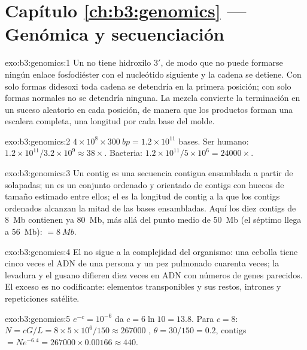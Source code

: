 \section*{Capítulo \ref{ch:b3:genomics} --- Genómica y secuenciación}

\begin{solution}{exo:b3:genomics:1}
Un  no tiene hidroxilo 3$'$, de modo que no puede
formarse ningún enlace fosfodiéster con el nucleótido siguiente y la
cadena se detiene. Con solo formas didesoxi toda cadena se detendría en
la primera posición; con solo formas normales no se detendría ninguna. La
mezcla convierte la terminación en un suceso aleatorio en cada posición,
de manera que los productos forman una escalera completa, una longitud
por cada base del molde.
\end{solution}

\begin{solution}{exo:b3:genomics:2}
$4\times 10^{8}\times \qty{300}{bp} = 1.2\times 10^{11}$ bases. Ser
humano: $1.2\times 10^{11}/3.2\times 10^{9} \approx 38\times$. Bacteria:
$1.2\times 10^{11}/5\times 10^{6} = \num{24000}\times$.
\end{solution}

\begin{solution}{exo:b3:genomics:3}
Un contig es una secuencia contigua ensamblada a partir de 
solapadas; un  es un conjunto ordenado y orientado de contigs con
huecos de tamaño estimado entre ellos; el  es la longitud de contig a
la que los contigs ordenados alcanzan la mitad de las bases ensambladas.
Aquí los diez contigs de \qty{8}{Mb} contienen ya \qty{80}{Mb}, más allá
del punto medio de \qty{50}{Mb} (el séptimo llega a \qty{56}{Mb}):
 $= \qty{8}{Mb}$.
\end{solution}

\begin{solution}{exo:b3:genomics:4}
El  no sigue a la complejidad del organismo: una cebolla
tiene cinco veces el ADN de una persona y un pez pulmonado cuarenta
veces; la levadura y el gusano difieren diez veces en ADN con números de
genes parecidos. El exceso es no codificante: elementos transponibles y
sus restos, intrones y repeticiones satélite.
\end{solution}

\begin{solution}{exo:b3:genomics:5}
$e^{-c} = 10^{-6}$ da $c = 6\ln 10 = 13.8$. Para $c = 8$: $N =
cG/L = 8\times 5\times 10^{6}/150 \approx \num{267000}$ , $\theta
= 30/150 = 0.2$, contigs $= N e^{-6.4} = \num{267000}\times 0.00166
\approx 440$.
\end{solution}

